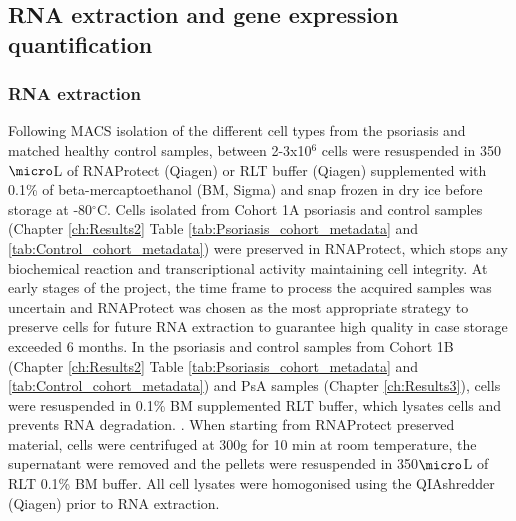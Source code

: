 

\subsection{RNA extraction and gene expression quantification}

\subsubsection{RNA extraction}
Following MACS isolation of the different cell types from the psoriasis and matched healthy control samples, between 2-3x10$^6$ cells were resuspended in 350$\micro$L of RNAProtect (Qiagen) or RLT buffer (Qiagen) supplemented with 0.1\% of beta-mercaptoethanol (BM, Sigma) and snap frozen in dry ice before storage at -80{$^\circ$}C. Cells isolated from Cohort 1A psoriasis and control samples (Chapter \ref{ch:Results2} Table \ref{tab:Psoriasis_cohort_metadata} and \ref{tab:Control_cohort_metadata}) were preserved in RNAProtect, which stops any biochemical reaction and transcriptional activity maintaining cell integrity. At early stages of the project, the time frame to process the acquired samples was uncertain and RNAProtect was chosen as the most appropriate strategy to preserve cells for future RNA extraction to guarantee high quality in case storage exceeded 6 months. In the psoriasis and control samples from Cohort 1B (Chapter \ref{ch:Results2} Table \ref{tab:Psoriasis_cohort_metadata} and \ref{tab:Control_cohort_metadata}) and PsA samples (Chapter \ref{ch:Results3}), cells were resuspended in 0.1\% BM supplemented RLT buffer, which lysates cells and prevents RNA degradation. . When starting from RNAProtect preserved material, cells were centrifuged at 300g for 10 min at room temperature, the supernatant were removed and the pellets were resuspended in 350$\micro$L of RLT 0.1\% BM buffer. All cell lysates were homogonised using the QIAshredder (Qiagen) prior to RNA extraction.

